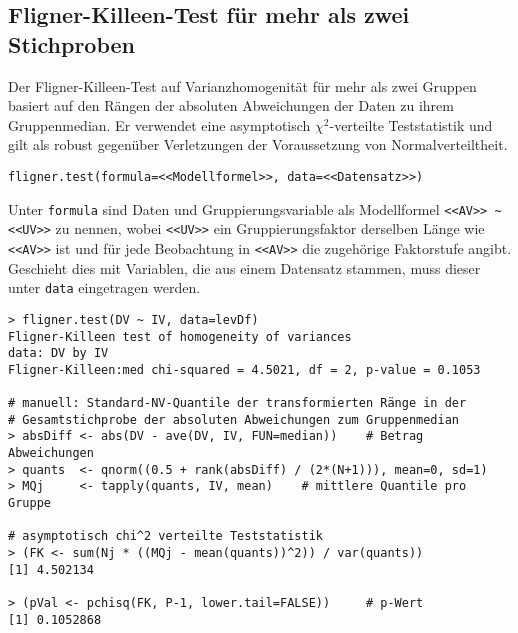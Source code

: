 \subsection{Fligner-Killeen-Test für mehr als zwei Stichproben}
\label{sec:fligner}

Der Fligner-Killeen-Test auf Varianzhomogenität für mehr als zwei Gruppen basiert auf den Rängen der absoluten Abweichungen der Daten zu ihrem Gruppenmedian. Er verwendet eine asymptotisch $\chi^{2}$-verteilte Teststatistik und gilt als robust gegenüber Verletzungen der Voraussetzung von Normalverteiltheit.
\begin{lstlisting}
fligner.test(formula=<<Modellformel>>, data=<<Datensatz>>)
\end{lstlisting}

Unter \lstinline!formula! sind Daten und Gruppierungsvariable als Modellformel \lstinline!<<AV>> ~ <<UV>>! zu nennen, wobei \lstinline!<<UV>>! ein Gruppierungsfaktor derselben Länge wie \lstinline!<<AV>>! ist und für jede Beobachtung in \lstinline!<<AV>>! die zugehörige Faktorstufe angibt. Geschieht dies mit Variablen, die aus einem Datensatz stammen, muss dieser unter \lstinline!data! eingetragen werden.

\begin{lstlisting}
> fligner.test(DV ~ IV, data=levDf)
Fligner-Killeen test of homogeneity of variances
data: DV by IV
Fligner-Killeen:med chi-squared = 4.5021, df = 2, p-value = 0.1053

# manuell: Standard-NV-Quantile der transformierten Ränge in der
# Gesamtstichprobe der absoluten Abweichungen zum Gruppenmedian
> absDiff <- abs(DV - ave(DV, IV, FUN=median))    # Betrag Abweichungen
> quants  <- qnorm((0.5 + rank(absDiff) / (2*(N+1))), mean=0, sd=1)
> MQj     <- tapply(quants, IV, mean)    # mittlere Quantile pro Gruppe

# asymptotisch chi^2 verteilte Teststatistik
> (FK <- sum(Nj * ((MQj - mean(quants))^2)) / var(quants))
[1] 4.502134

> (pVal <- pchisq(FK, P-1, lower.tail=FALSE))     # p-Wert
[1] 0.1052868
\end{lstlisting}


